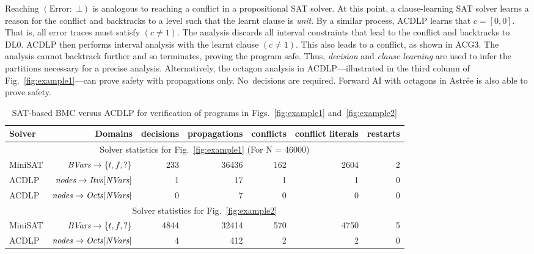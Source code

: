 Reaching $(\mathrm{Error}{:}\;\bot)$ is analogous to reaching a conflict in
a propositional SAT solver.  At this point, a clause-learning SAT solver
learns a reason for the conflict and backtracks to a level such that the
learnt clause is \textit{unit}.  By a similar process, ACDLP learns that
$c=[0,0]$.  That is, all error traces must satisfy $(c \neq 1)$.  The
analysis discards all interval constraints that lead to the conflict and
backtracks to DL0.  ACDLP then performs interval analysis with the learnt
clause $(c \neq 1)$.  This also leads to a conflict, as shown in ACG3.  The
analysis cannot backtrack further and so terminates, proving the program
safe.  Thus, {\em decision} and {\em clause learning} are used to infer the
partitions necessary for a precise analysis.  Alternatively, the octagon
analysis in ACDLP---illustrated in the third column of
Fig.~\ref{fig:example1}---can prove safety with propagations only. 
No~decisions are required.  Forward AI with octagons in Astr{\'e}e is also
able to prove safety.  
%
\begin{table}[!b]
\begin{center}
{
\begin{tabular}{l|r|r|r|r|r|r}
\hline
  Solver & Domains & decisions & propagations & conflicts & conflict literals & restarts \\ \hline
  \multicolumn{7}{c}{Solver statistics for Fig.~\ref{fig:example1} (For N = 46000)} \\ \hline
  MiniSAT & $\mathit{BVars} \rightarrow \{t,f,?\} $ & 233 & 36436 & 162 & 2604 & 2 \\ \hline
  ACDLP & $\mathit{nodes} \rightarrow \mathit{Itvs}[\mathit{NVars}]$ & 1 & 17 & 1 & 1 & 0 \\ \hline
  ACDLP & $\mathit{nodes} \rightarrow \mathit{Octs}[\mathit{NVars}]$ & 0 & 7 & 0 & 0 & 0 \\ \hline 
  \multicolumn{7}{c}{Solver statistics for Fig.~\ref{fig:example2}} \\ \hline
  MiniSAT & $\mathit{BVars} \rightarrow \{t,f,?\} $ & 4844 & 32414 & 570 & 4750 & 5 \\ \hline
  ACDLP & $\mathit{nodes} \rightarrow \mathit{Octs}[\mathit{NVars}]$ & 4 & 412 & 2 & 2 & 0 \\ 
\hline
\end{tabular}
}
\end{center}
\caption{SAT-based BMC versus ACDLP for verification of programs in Figs.~\ref{fig:example1} and~\ref{fig:example2}}
\label{solver}
\end{table}
%
%
